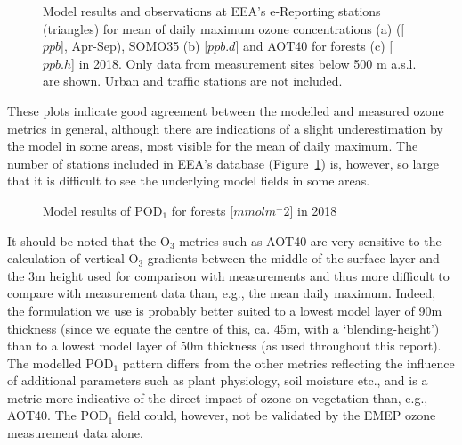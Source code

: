 \begin{figure}[H]
  \centering
\caption{Model results and observations at EEA's e-Reporting stations (triangles) for mean of daily maximum ozone concentrations (a) ([$ppb$], Apr-Sep), SOMO35 (b) [$ppb.d$] and AOT40 for forests (c) [$ppb.h$] in 2018. Only data from measurement sites below 500 m a.s.l. are shown. Urban and traffic stations are not included.}
\label{fig:indicators_airbase}
\end{figure}

These plots indicate good agreement between the modelled and measured ozone metrics in general, although there are indications of a slight underestimation by the model in some areas, most visible for the mean of daily maximum. The number of stations included in EEA's database (Figure~\ref{fig:indicators_airbase}) is, however, so large that it is difficult to see the underlying model fields in some areas.

\begin{figure}[H]
\caption{Model results of POD$_1$ for forests [$mmol m^-2$] in 2018}
\label{fig:indicatorPOD}
\end{figure}

It should be noted that the O$_3$ metrics such as AOT40 are very sensitive to the calculation of vertical O$_3$ gradients between the middle of the surface layer and the 3m height used for comparison with measurements \citep{Tuovinen:EP2007} and thus more difficult to compare with measurement data than, e.g., the mean daily maximum. Indeed, the formulation we use \citep{Simpson_et_al:EMEP} is probably better suited to a lowest model layer of 90m thickness (since we equate the centre of this, ca. 45m, with a `blending-height') than to a lowest model layer of 50m thickness (as used throughout this report). 
The modelled POD$_1$ pattern differs from the other metrics reflecting the influence of additional parameters such as plant physiology, soil moisture etc., and is a metric more indicative of the direct impact of ozone on vegetation than, e.g., AOT40. The POD$_1$ field could, however, not be validated by the EMEP ozone measurement data alone. 

